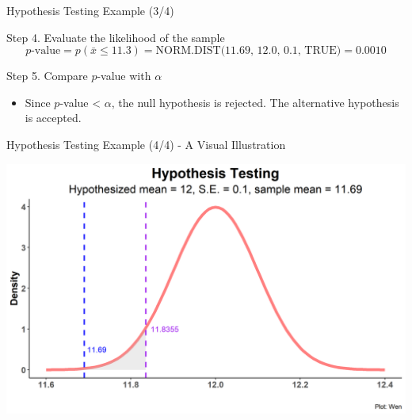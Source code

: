 \documentclass{beamer}
\begin{document}
\begin{frame}{Hypothesis Testing Example (3/4)}


Step 4. Evaluate the likelihood of the sample
$$p\text{-value} = p(\bar{x} \leq 11.3) = \text{NORM.DIST(11.69, 12.0, 0.1, TRUE)} = 0.0010 $$ 

Step 5. Compare $p$-value with $\alpha$

\vspace{0.2 cm}
\begin{itemize}
\item Since $p$-value < $\alpha$, the null hypothesis is rejected. The alternative hypothesis is accepted. 
\end{itemize}

\end{frame}



\begin{frame}{Hypothesis Testing Example (4/4) - A Visual Illustration}

\includegraphics[scale=0.5]{images/HypothesisTesting12.png}


\end{frame}
\end{document}
